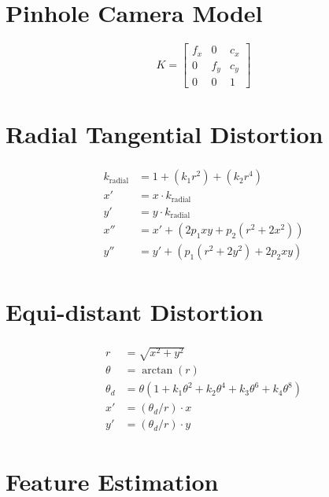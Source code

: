 \documentclass{report}
\begin{document}
\section{Pinhole Camera Model}

\begin{equation}
  K =
  \begin{bmatrix}
    f_x & 0 & c_x \\
    0 & f_y & c_y \\
    0 & 0 & 1
  \end{bmatrix}
\end{equation}



\section{Radial Tangential Distortion}

\begin{align}
\begin{split}
  k_{\text{radial}} &= 1 + (k_1 r^2) + (k_2 r^4) \\
  x' &= x \cdot k_{\text{radial}} \\
  y' &= y \cdot k_{\text{radial}} \\
  x'' &= x' + (2 p_1 x y + p_2 (r^2 + 2 x^2)) \\
  y'' &= y' + (p_1 (r^2 + 2 y^2) + 2 p_2 x y)
\end{split}
\end{align}



\section{Equi-distant Distortion}

\begin{align}
\begin{split}
  r &= \sqrt{x^{2} + y^{2}} \\
  \theta &= \arctan{(r)} \\
  \theta_d &= \theta (1 + k_1 \theta^2 + k_2 \theta^4 + k_3 \theta^6 + k_4 \theta^8) \\
  x' &= (\theta_d / r) \cdot x \\
  y' &= (\theta_d / r) \cdot y
\end{split}
\end{align}



\section{Feature Estimation}
\label{sec:feature_estimation}
\end{document}
